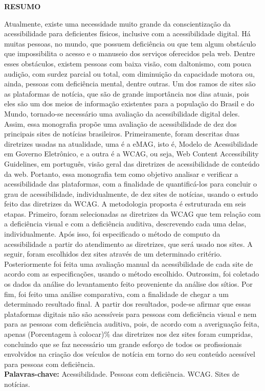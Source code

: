 \documentclass[a4paper]{article}
\begin{document}
\begin{titlepage}
	\begin{center}
		{\large \textbf{RESUMO}}\\[1cm]
	\end{center}
	\fontsize{12pt}{0pt}\selectfont
	\onehalfspacing
	Atualmente, existe uma necessidade muito grande da conscientização da acessibilidade para deficientes físicos, inclusive com a acessibilidade digital. Há muitas pessoas, no mundo, que possuem deficiência ou que tem algum obstáculo que impossibilita o acesso e o manuseio dos serviços oferecidos pela web. Dentre esses obstáculos, existem pessoas com baixa visão, com daltonismo, com pouca audição, com surdez parcial ou total, com diminuição da capacidade motora ou, ainda, pessoas com deficiência mental, dentre outras. Um dos ramos de sites são as plataformas de notícia, que são de grande importância nos dias atuais, pois eles são um dos meios de informação existentes para a população do Brasil e do Mundo, tornado-se necessário uma avaliação da acessibilidade digital deles. Assim, essa monografia propõe uma avaliação de acessibilidade de dez dos principais sites de notícias brasileiros. Primeiramente, foram descritas duas diretrizes usadas na atualidade, uma é a eMAG, isto é, Modelo de Acessibilidade em Governo Eletrônico, e a outra é a WCAG, ou seja, Web Content Accessibility Guidelines, em português, visão geral das diretrizes de acessibilidade de conteúdo da web. Portanto, essa monografia tem como objetivo analisar e verificar a acessibilidade das plataformas, com a finalidade de quantificá-los para concluir o grau de acessibilidade, individualmente, de dez sites de notícias, usando o estudo feito das diretrizes da WCAG. A metodologia proposta é estruturada em seis etapas. Primeiro, foram selecionadas as diretrizes da WCAG que tem relação com a deficiência visual e com a deficiência auditiva, descrevendo cada uma delas, individualmente. Após isso, foi especificado o método de computo da acessibilidade a partir do atendimento as diretrizes, que será usado nos sites. A seguir, foram escolhidos dez sites através de um determinado critério. Posteriormente foi feita uma avaliação manual da acessibilidade de cada site de acordo com as especificações, usando o método escolhido. Outrossim, foi coletado os dados da análise do levantamento feito proveniente da análise dos sítios. Por fim, foi feito uma análise comparativa, com a finalidade de chegar a um determinado resultado final. A partir dos resultados, pode-se afirmar que essas plataformas digitais não são acessíveis para pessoas com deficiência visual e nem para as pessoas com deficiência auditiva, pois, de acordo com a averiguação feita, apenas (Porcentagem à colocar)\% das diretrizes nos dez sites foram cumpridas, concluindo que se faz necessário um grande esforço de todos os profissionais envolvidos na criação dos veículos de notícia em torno do seu conteúdo acessível para pessoas com deficiência.\\[1cm]
	{\large \textbf{Palavras-chave: }}Acessibilidade. Pessoas com deficiência. WCAG. Sites de notícias.\\[1cm]
\end{titlepage}
\end{document}

